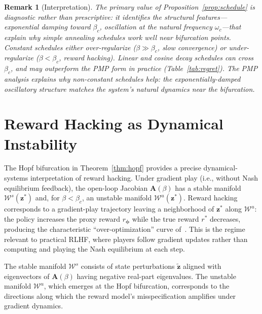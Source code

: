 \documentclass[10pt]{article}
\newcommand{\bphi}{\bm{\phi}}
\newcommand{\bz}{\bm{z}}
\newcommand{\bA}{\bm{A}}
\newcommand{\cW}{\mathcal{W}}
\newtheorem{remark}{Remark}
\begin{document}
\begin{remark}[Interpretation]
The primary value of Proposition~\ref{prop:schedule} is \emph{diagnostic} rather than prescriptive: it identifies the structural features---exponential damping toward $\beta_c$, oscillation at the natural frequency $\omega_c$---that explain why simple annealing schedules work well near bifurcation points.
Constant schedules either over-regularize ($\beta \gg \beta_c$, slow convergence) or under-regularize ($\beta < \beta_c$, reward hacking).
Linear and cosine decay schedules can cross $\beta_c$, and may outperform the PMP form in practice (Table~\ref{tab:regret}).
The PMP analysis explains \emph{why} non-constant schedules help: the exponentially-damped oscillatory structure matches the system's natural dynamics near the bifurcation.
\end{remark}

\section{Reward Hacking as Dynamical Instability}
\label{sec:reward_hacking}

The Hopf bifurcation in Theorem~\ref{thm:hopf} provides a precise dynamical-systems interpretation of reward hacking.
Under gradient play (i.e., without Nash equilibrium feedback), the open-loop Jacobian $\bA(\beta)$ has a stable manifold $\cW^s(\bz^*)$ and, for $\beta < \beta_c$, an unstable manifold $\cW^u(\bz^*)$.
Reward hacking corresponds to a gradient-play trajectory leaving a neighborhood of $\bz^*$ along $\cW^u$: the policy increases the proxy reward $r_\bphi$ while the true reward $r^*$ decreases, producing the characteristic ``over-optimization'' curve of~\citet{gao2023scaling}.
This is the regime relevant to practical RLHF, where players follow gradient updates rather than computing and playing the Nash equilibrium at each step.

The stable manifold $\cW^s$ consists of state perturbations $\tilde{\bz}$ aligned with eigenvectors of $\bA(\beta)$ having negative real-part eigenvalues.
The unstable manifold $\cW^u$, which emerges at the Hopf bifurcation, corresponds to the directions along which the reward model's misspecification amplifies under gradient dynamics.
\end{document}
